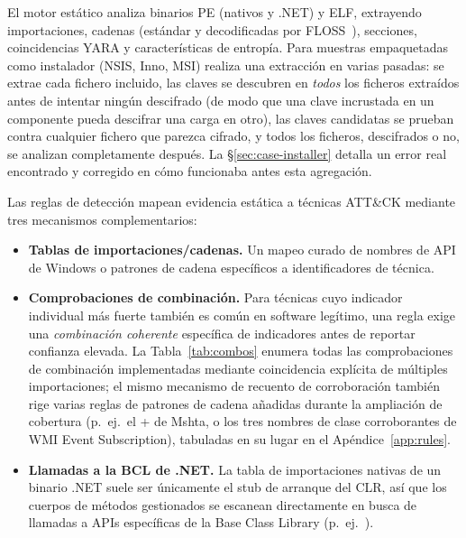 El motor est\'atico analiza binarios PE (nativos y .NET) y ELF,
extrayendo importaciones, cadenas (est\'andar y decodificadas por
FLOSS~\cite{floss}), secciones, coincidencias YARA y caracter\'isticas
de entrop\'ia. Para muestras empaquetadas como instalador (NSIS, Inno,
MSI) realiza una extracci\'on en varias pasadas: se extrae cada
fichero incluido, las claves se descubren en \emph{todos} los ficheros
extra\'idos antes de intentar ning\'un descifrado (de modo que una
clave incrustada en un componente pueda descifrar una carga en otro),
las claves candidatas se prueban contra cualquier fichero que parezca
cifrado, y todos los ficheros, descifrados o no, se analizan
completamente despu\'es. La \S\ref{sec:case-installer} detalla un error
real encontrado y corregido en c\'omo funcionaba antes esta
agregaci\'on.

Las reglas de detecci\'on mapean evidencia est\'atica a t\'ecnicas
ATT\&CK mediante tres mecanismos complementarios:

\begin{itemize}
  \item \textbf{Tablas de importaciones/cadenas.} Un mapeo curado de
    nombres de API de Windows o patrones de cadena espec\'ificos a
    identificadores de t\'ecnica.
  \item \textbf{Comprobaciones de combinaci\'on.} Para t\'ecnicas cuyo
    indicador individual m\'as fuerte tambi\'en es com\'un en software
    leg\'itimo, una regla exige una \emph{combinaci\'on coherente}
    espec\'ifica de indicadores antes de reportar confianza elevada. La
    Tabla~\ref{tab:combos} enumera todas las comprobaciones de
    combinaci\'on implementadas mediante coincidencia expl\'icita de
    m\'ultiples importaciones; el mismo mecanismo de recuento de
    corroboraci\'on tambi\'en rige varias reglas de patrones de cadena
    a\~nadidas durante la ampliaci\'on de cobertura (p.\ ej.\ el
     +  de Mshta, o los tres nombres de clase
    corroborantes de WMI Event Subscription), tabuladas en su lugar en
    el Ap\'endice~\ref{app:rules}.
  \item \textbf{Llamadas a la BCL de .NET.} La tabla de importaciones
    nativas de un binario .NET suele ser \'unicamente el stub de
    arranque del CLR, as\'i que los cuerpos de m\'etodos gestionados se
    escanean directamente en busca de llamadas a APIs espec\'ificas de
    la Base Class Library (p.\ ej.\ ).
\end{itemize}

